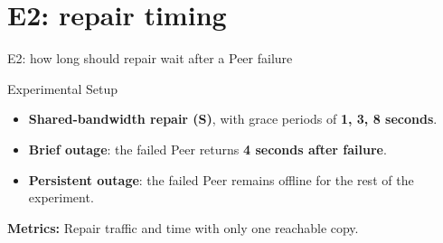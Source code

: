 \section{E2: repair timing}
\begin{frame}{E2: how long should repair wait after a Peer failure}
\begin{block}{Experimental Setup}
\begin{itemize}
  \item \textbf{Shared-bandwidth repair (S)}, with grace periods
        of \textbf{1, 3, 8 seconds}.
  \item \textbf{Brief outage}: the failed Peer returns
        \textbf{4 seconds after failure}.
  \item \textbf{Persistent outage}: the failed Peer remains offline
        for the rest of the experiment.
\end{itemize}
\end{block}

\vspace{3mm}
\textbf{Metrics:} Repair traffic and time with only one reachable copy.

\end{frame}


